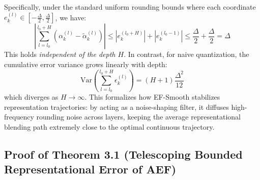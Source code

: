 \documentclass{article}
\theoremstyle{plain}
\theoremstyle{definition}
\theoremstyle{remark}
\begin{document}
Specifically, under the standard uniform rounding bounds where each coordinate $e_k^{(l)} \in [-\frac{\Delta}{2}, \frac{\Delta}{2}]$, we have:
\begin{equation}
    \left| \sum_{l=l_0}^{l_0+H} \left( \alpha_k^{(l)} - \tilde{\alpha}_k^{(l)} \right) \right| \leq \left| e_k^{(l_0+H)} \right| + \left| e_k^{(l_0-1)} \right| \leq \frac{\Delta}{2} + \frac{\Delta}{2} = \Delta
\end{equation}
This holds \emph{independent of the depth $H$}. In contrast, for naive quantization, the cumulative error variance grows linearly with depth:
\begin{equation}
    \text{Var}\left( \sum_{l=l_0}^{l_0+H} \epsilon_k^{(l)} \right) = (H+1) \frac{\Delta^2}{12}
\end{equation}
which diverges as $H \to \infty$. This formalizes how EF-Smooth stabilizes representation trajectories: by acting as a noise-shaping filter, it diffuses high-frequency rounding noise across layers, keeping the average representational blending path extremely close to the optimal continuous trajectory.

\subsection{Proof of Theorem 3.1 (Telescoping Bounded Representational Error of AEF)}
\label{app:aef_proof}
\end{document}
